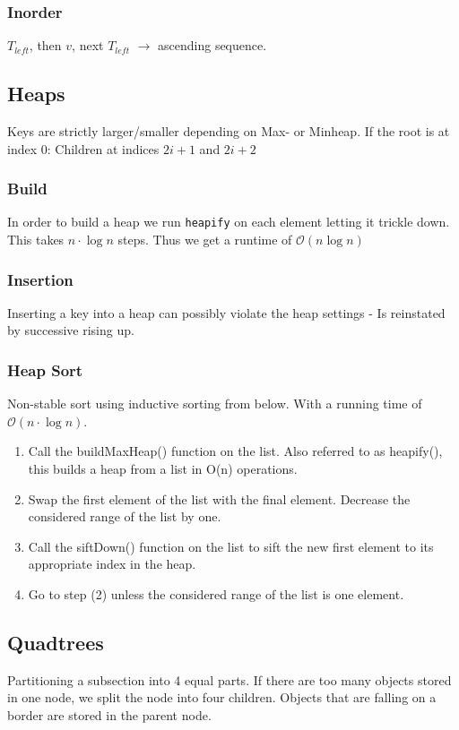 \documentclass[9pt,landscape,a4paper, table]{extarticle}
\begin{document}
\begin{multicols*}{3}
\subsubsection{Inorder}
$T_{left}$, then $v$, next $T_{left}$ $\rightarrow$ ascending sequence.

\subsection{Heaps}
Keys are strictly larger/smaller depending on Max- or Minheap. If the root is at index $0$: Children at indices $2i + 1$ and $2i + 2$
\subsubsection{Build}
In order to build a heap we run \texttt{heapify} on each element letting it trickle down. This takes $n\cdot \log n$ steps. Thus we get a runtime of $\mathcal{O}(n \log n)$ 
\subsubsection{Insertion}
Inserting a key into a heap can possibly violate the heap settings - Is reinstated by successive rising up. 
\subsubsection{Heap Sort}
Non-stable sort using inductive sorting from below. With a running time of $\mathcal{O}(n\cdot \log n)$.

\begin{enumerate}
    \item Call the buildMaxHeap() function on the list. Also referred to as heapify(), this builds a heap from a list in O(n) operations.
\item Swap the first element of the list with the final element. Decrease the considered range of the list by one.
\item Call the siftDown() function on the list to sift the new first element to its appropriate index in the heap.
\item Go to step (2) unless the considered range of the list is one element.
\end{enumerate}

\subsection{Quadtrees}
Partitioning a subsection into 4 equal parts. If there are too many objects stored in one node, we split the node into four children. Objects that are falling on a border are stored in the parent node.


\end{multicols*}
\end{document}
